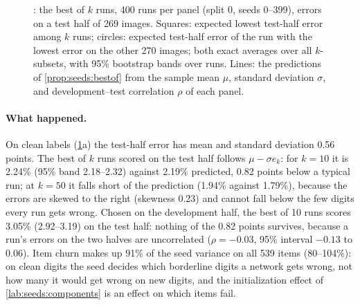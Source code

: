 \begin{refsection}
\begin{figure}[t]
\begin{fullwidth}

\smallskip
{}
\caption{: the best of $k$ runs, 400 runs per panel (split 0, seeds $0$--$399$), errors on a test half of 269 images. Squares: expected lowest test-half error among $k$ runs; circles: expected test-half error of the run with the lowest error on the other 270 images; both exact averages over all $k$-subsets, with 95\% bootstrap bands over runs. Lines: the predictions of \cref{prop:seeds:bestof} from the sample mean $\mu$, standard deviation $\sigma$, and development--test correlation $\rho$ of each panel.}
\label{fig:seeds:bestof}
\end{fullwidth}
\end{figure}

\paragraph{What happened.} On clean labels (\cref{fig:seeds:bestof}a) the test-half error has mean  and standard deviation 0.56 points. The best of $k$ runs scored on the test half follows $\mu-\sigma e_k$: for $k=10$ it is 2.24\% (95\% band 2.18--2.32) against 2.19\% predicted, 0.82 points below a typical run; at $k=50$ it falls short of the prediction (1.94\% against 1.79\%), because the errors are skewed to the right (skewness 0.23) and cannot fall below the few digits every run gets wrong. Chosen on the development half, the best of 10 runs scores 3.05\% (2.92--3.19) on the test half: nothing of the 0.82 points survives, because a run's errors on the two halves are uncorrelated ($\rho=-0.03$, 95\% interval $-0.13$ to $0.06$). Item churn makes up 91\% of the seed variance on all 539 items (80--104\%): on clean digits the seed decides which borderline digits a network gets wrong, not how many it would get wrong on new digits, and the initialization effect of \cref{lab:seeds:components} is an effect on which items fail.


\end{refsection}
